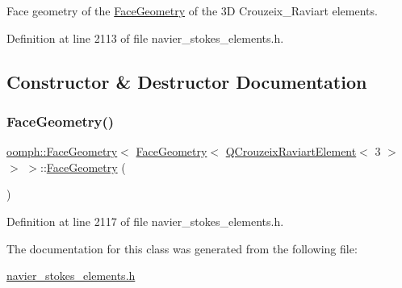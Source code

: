 Face geometry of the \hyperlink{classoomph_1_1FaceGeometry}{Face\+Geometry} of the 3D Crouzeix\+\_\+\+Raviart elements. 

Definition at line 2113 of file navier\+\_\+stokes\+\_\+elements.\+h.



\subsection{Constructor \& Destructor Documentation}
\mbox{\label{classoomph_1_1FaceGeometry_3_01FaceGeometry_3_01QCrouzeixRaviartElement_3_013_01_4_01_4_01_4_a6bc0b46a8283deaa65f61610cf0d2591}} 
\subsubsection{\texorpdfstring{Face\+Geometry()}{FaceGeometry()}}
{\footnotesize\ttfamily \hyperlink{classoomph_1_1FaceGeometry}{oomph\+::\+Face\+Geometry}$<$ \hyperlink{classoomph_1_1FaceGeometry}{Face\+Geometry}$<$ \hyperlink{classoomph_1_1QCrouzeixRaviartElement}{Q\+Crouzeix\+Raviart\+Element}$<$ 3 $>$ $>$ $>$\+::\hyperlink{classoomph_1_1FaceGeometry}{Face\+Geometry} (\begin{DoxyParamCaption}{ }\end{DoxyParamCaption})\hspace{0.3cm}{\ttfamily [inline]}}



Definition at line 2117 of file navier\+\_\+stokes\+\_\+elements.\+h.



The documentation for this class was generated from the following file\+:\begin{DoxyCompactItemize}
\item 
\hyperlink{navier__stokes__elements_8h}{navier\+\_\+stokes\+\_\+elements.\+h}\end{DoxyCompactItemize}
